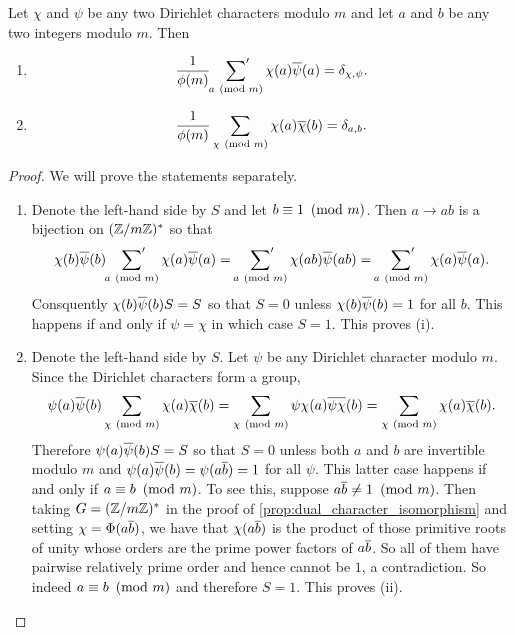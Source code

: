      \begin{proposition}\label{prop:Dirichlet_orthogonality_relations}
        Let $\chi$ and $\psi$ be any two Dirichlet characters modulo $m$ and let $a$ and $b$ be any two integers modulo $m$. Then
        \begin{enumerate}[label=(\roman*)]
          \item
          \[
            \frac{1}{\phi(m)}\sideset{}{'}\sum_{a \ \left(\text{mod }m\right)}\chi(a)\overline{\psi}(a) = \delta_{\chi,\psi}.
          \]
          \item
          \[
            \frac{1}{\phi(m)}\sum_{\chi \ \left(\text{mod }m\right)}\chi(a)\overline{\chi}(b) = \delta_{a,b}.
          \]
        \end{enumerate}
      \end{proposition}
      \begin{proof}
        We will prove the statements separately.
        \begin{enumerate}[label=(\roman*)]
          \item Denote the left-hand side by $S$ and let $b \equiv 1 \ \left(\text{mod }m\right)$. Then $a \to ab$ is a bijection on $(\mathbb{Z}/m\mathbb{Z})^{\ast}$ so that
          \[
            \chi(b)\overline{\psi}(b)\sideset{}{'}\sum_{a \ \left(\text{mod }m\right)}\chi(a)\overline{\psi}(a) = \sideset{}{'}\sum_{a \ \left(\text{mod }m\right)}\chi(ab)\overline{\psi}(ab) = \sideset{}{'}\sum_{a \ \left(\text{mod }m\right)}\chi(a)\overline{\psi}(a).
          \]
          Consquently $\chi(b)\overline{\psi}(b)S = S$ so that $S = 0$ unless $\chi(b)\overline{\psi}(b) = 1$ for all $b$. This happens if and only if $\psi = \chi$ in which case $S = 1$. This proves (i).
          \item Denote the left-hand side by $S$. Let $\psi$ be any Dirichlet character modulo $m$. Since the Dirichlet characters form a group,
          \[
            \psi(a)\overline{\psi}(b)\sum_{\chi \ \left(\text{mod }m\right)}\chi(a)\overline{\chi}(b) = \sum_{\chi \ \left(\text{mod }m\right)}\psi\chi(a)\overline{\psi\chi}(b) = \sum_{\chi \ \left(\text{mod }m\right)}\chi(a)\overline{\chi}(b).
          \]
          Therefore $\psi(a)\overline{\psi}(b)S = S$ so that $S = 0$ unless both $a$ and $b$ are invertible modulo $m$ and $\psi(a)\overline{\psi}(b) = \psi(a\overline{b}) = 1$ for all $\psi$. This latter case happens if and only if $a \equiv b \ \left(\text{mod }m\right)$. To see this, suppose $a\overline{b} \neq 1 \ \left(\text{mod }m\right)$. Then taking $G = (\mathbb{Z}/m\mathbb{Z})^{\ast}$ in the proof of \cref{prop:dual_character_isomorphism} and setting $\chi = \Phi(a\overline{b})$, we have that $\chi(a\overline{b})$ is the product of those primitive roots of unity whose orders are the prime power factors of $a\overline{b}$. So all of them have pairwise relatively prime order and hence cannot be $1$, a contradiction. So indeed $a \equiv b \ \left(\text{mod }m\right)$ and therefore $S = 1$. This proves (ii).
        \end{enumerate}
      \end{proof}

